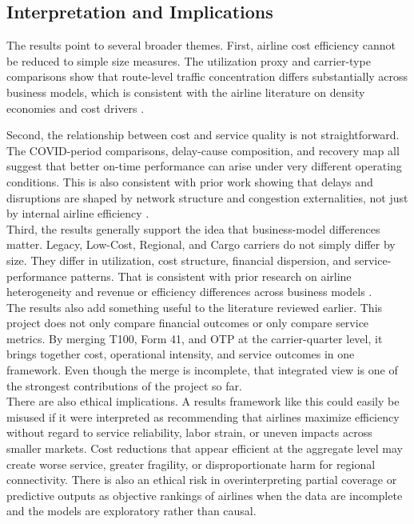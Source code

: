 \documentclass[11pt, letterpaper]{article}
\begin{document}
\subsection{Interpretation and Implications}
The results point to several broader themes. First, airline cost efficiency cannot be reduced to simple size measures. The utilization proxy and carrier-type comparisons show that route-level traffic concentration differs substantially across business models, which is consistent with the airline literature on density economies and cost drivers \cite{banker1993,caves1984,barbot2008,zuidberg2014}.

Second, the relationship between cost and service quality is not straightforward. The COVID-period comparisons, delay-cause composition, and recovery map all suggest that better on-time performance can arise under very different operating conditions. This is also consistent with prior work showing that delays and disruptions are shaped by network structure and congestion externalities, not just by internal airline efficiency \cite{mayer2002,lee2023}.\\
\indent Third, the results generally support the idea that business-model differences matter. Legacy, Low-Cost, Regional, and Cargo carriers do not simply differ by size. They differ in utilization, cost structure, financial dispersion, and service-performance patterns. That is consistent with prior research on airline heterogeneity and revenue or efficiency differences across business models \cite{fontanet2022,gillen2004,nguyen2022,li2025}.\\
\indent The results also add something useful to the literature reviewed earlier. This project does not only compare financial outcomes or only compare service metrics. By merging T100, Form 41, and OTP at the carrier-quarter level, it brings together cost, operational intensity, and service outcomes in one framework. Even though the merge is incomplete, that integrated view is one of the strongest contributions of the project so far.\\
\indent There are also ethical implications. A results framework like this could easily be misused if it were interpreted as recommending that airlines maximize efficiency without regard to service reliability, labor strain, or uneven impacts across smaller markets. Cost reductions that appear efficient at the aggregate level may create worse service, greater fragility, or disproportionate harm for regional connectivity. There is also an ethical risk in overinterpreting partial coverage or predictive outputs as objective rankings of airlines when the data are incomplete and the models are exploratory rather than causal.
\end{document}
